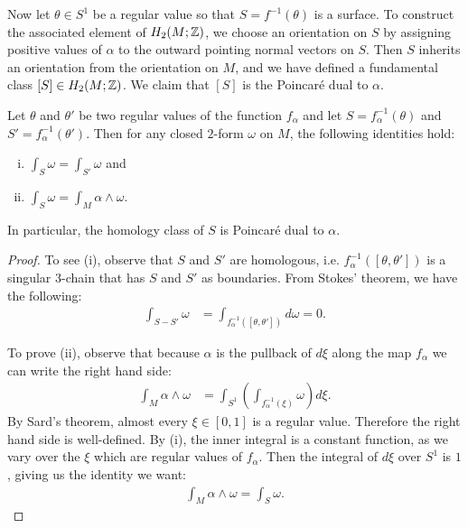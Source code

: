 Now let $\theta \in S^1$ be a regular value so that $S = f^{-1}(\theta)$ is a surface.
To construct the associated element of $H_2(M;\mathbb{Z})$, we choose an orientation on $S$ by assigning positive values of $\alpha$ to the outward pointing normal vectors on $S$.
Then $S$ inherits an orientation from the orientation on $M$, and we have defined a
fundamental class $[S]\in H_2(M;\mathbb{Z})$.
We claim that $[S]$ is the Poincar\'e dual to $\alpha$.
\begin{lem}
  Let $\theta$ and $\theta'$ be two regular values of the function $f_{\alpha}$ and let $S=f_\alpha^{-1}(\theta)$ and $S'=f_\alpha^{-1}(\theta')$.
  Then for any closed $2$-form $\omega$ on $M$, the following identities hold:
  \begin{enumerate}[(i)]
  \item $\displaystyle
    \int_{S} \omega = \displaystyle\int_{S'} \omega$ and
 \item $\displaystyle
    \int_S \omega = \displaystyle\int_M \alpha \wedge \omega.$
  \end{enumerate}
  In particular, the homology class of $S$ is Poincar\'e dual to $\alpha$.
\end{lem}
\begin{proof}
  To see (i), observe that $S$ and $S'$ are homologous, i.e. $f^{-1}_{\alpha}([\theta, \theta'])$ is a singular $3$-chain that has $S$ and $S'$ as boundaries.
  From Stokes' theorem, we have the following:
  \begin{align*}
    \int_{S - S'} \omega &= \int_{f_{\alpha}^{-1}([\theta, \theta'])} d\omega
                         = 0.
  \end{align*}

  To prove (ii), observe that because $\alpha$ is the pullback of $d\xi$ along the map $f_{\alpha}$ we can write the right hand side:
  \begin{align*}
    \int_M \alpha \wedge \omega &= \int_{S^1} \left(   \int_{f_{\alpha}^{-1}(\xi)} \omega \right) d\xi.
  \end{align*}
  By Sard's theorem, almost every $\xi \in [0,1]$ is a regular value.  Therefore the right hand side is well-defined.
  By (i), the inner integral is a constant function, as we vary over the $\xi$ which are regular values of $f_{\alpha}$.
  Then the integral of $d\xi$ over $S^1$ is $1$, giving us the identity we want:
  \begin{align*}
    \int_M \alpha \wedge \omega = \int_S \omega.
  \end{align*}
\end{proof}
